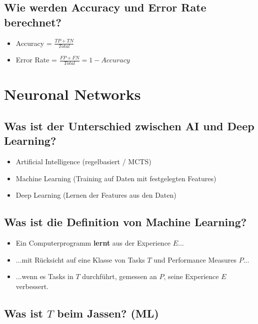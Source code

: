 \documentclass[a4paper]{article}
\begin{document}
		\subsection{Wie werden Accuracy und Error Rate berechnet?}
		
		\begin{itemize}
			\item Accuracy = $\frac{TP + TN}{Total}$\\
			\item Error Rate = $\frac{FP + FN}{Total} = 1 - Accuracy$
		\end{itemize}
	
	\section{Neuronal Networks}
	
		\subsection{Was ist der Unterschied zwischen AI und Deep Learning?}
		
		\begin{itemize}
			\item Artificial Intelligence (regelbasiert / MCTS)
			\item Machine Learning (Training auf Daten mit festgelegten Features)
			\item Deep Learning (Lernen der Features aus den Daten)
		\end{itemize}
	
		\subsection{Was ist die Definition von Machine Learning?}
		
		\begin{itemize}
			\item Ein Computerprogramm \textbf{lernt} aus der Experience $E$...
			\item ...mit Rücksicht auf eine Klasse von Tasks $T$ und Performance Measures $P$...
			\item ...wenn es Tasks in $T$ durchführt, gemessen an $P$, seine Experience $E$ verbessert.
		\end{itemize}
	
		\subsection{Was ist $T$ beim Jassen? (ML)} 
		
\end{document}
